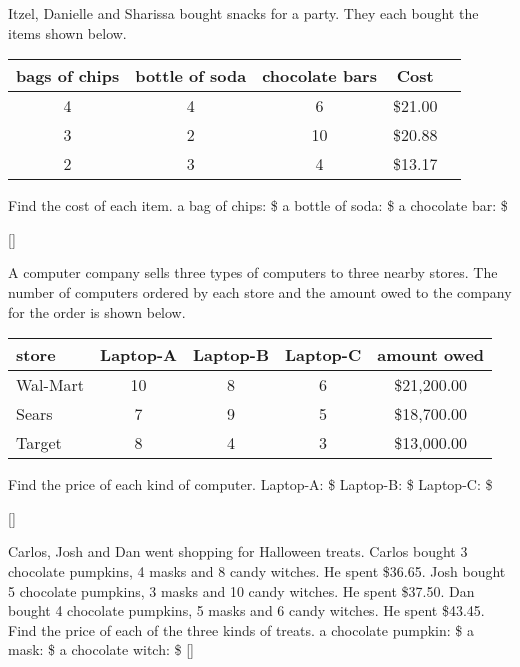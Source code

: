 \documentclass[12pt,letterpaper]{memoir}
\begin{document}
%
%
\myWideProblemWithContent
{
    Itzel, Danielle and Sharissa bought snacks for a party. 
    They each bought the items shown below.
    \begin{center}
        \small
        \begin{tabular}{ccccc}
            bags of chips & bottle of soda & chocolate bars & Cost \\
            \toprule
            4 & 4 & 6  & \$21.00  \\
            3 & 2 & 10 & \$20.88  \\
            2 & 3 &  4 & \$13.17  \\
        \end{tabular}
    \end{center}
    Find the cost of each item.
    \mySystemTable[7]
    \small
    a bag of chips: \$
    \hfill 
    a bottle of soda: \$
    \hfill 
    a chocolate bar: \$
    }[\small]


%
%
\myWideProblemWithContent
{
    A computer company sells three types of computers 
    to three nearby stores. 
    The number of computers ordered by each store and the amount owed to the
    company for the order is shown below.
    \begin{center}
        \small
        \begin{tabular}{lcccc}
            store & Laptop-A & Laptop-B & Laptop-C & amount owed \\
            \toprule
            Wal-Mart & 10 & 8 & 6 & \$21,200.00  \\
            Sears    & 7  & 9 & 5 & \$18,700.00  \\
            Target   & 8  & 4 & 3 & \$13,000.00  \\
        \end{tabular}
    \end{center}
    Find the price of each kind of computer.
    \mySystemTable[7]
    \small
    Laptop-A: \$
    \hfil 
    Laptop-B: \$
    \hfil 
    Laptop-C: \$
    }[\small]


%
%
\myWideProblemWithContent
{
    Carlos, Josh and Dan went shopping for Halloween treats. 
    Carlos bought 3 chocolate pumpkins, 4 masks and 8 candy witches. 
    He spent \$36.65. 
    Josh bought 5 chocolate pumpkins, 3 masks and 10 candy witches. 
    He spent \$37.50. 
    Dan bought 4 chocolate pumpkins, 5 masks and 6 candy witches. 
    He spent \$43.45. \\[1\onelineskip]
    Find the price of each of the three kinds of treats.
    \mySystemTable[7]
    \small
    a chocolate pumpkin: \$
    \hfill 
    a mask: \$
    \hfill 
    a chocolate witch: \$
    }[\small]
\end{document}
